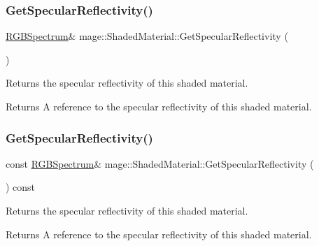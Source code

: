 \subsubsection{\texorpdfstring{Get\+Specular\+Reflectivity()}{GetSpecularReflectivity()}\hspace{0.1cm}{\footnotesize\ttfamily [1/2]}}
{\footnotesize\ttfamily \hyperlink{structmage_1_1_r_g_b_spectrum}{R\+G\+B\+Spectrum}\& mage\+::\+Shaded\+Material\+::\+Get\+Specular\+Reflectivity (\begin{DoxyParamCaption}{ }\end{DoxyParamCaption})\hspace{0.3cm}{\ttfamily [noexcept]}}

Returns the specular reflectivity of this shaded material.

\begin{DoxyReturn}{Returns}
A reference to the specular reflectivity of this shaded material. 
\end{DoxyReturn}
\hypertarget{structmage_1_1_shaded_material_a7655315b6654ee4f6f34ac2489ee6f92}{}\label{structmage_1_1_shaded_material_a7655315b6654ee4f6f34ac2489ee6f92} 
\subsubsection{\texorpdfstring{Get\+Specular\+Reflectivity()}{GetSpecularReflectivity()}\hspace{0.1cm}{\footnotesize\ttfamily [2/2]}}
{\footnotesize\ttfamily const \hyperlink{structmage_1_1_r_g_b_spectrum}{R\+G\+B\+Spectrum}\& mage\+::\+Shaded\+Material\+::\+Get\+Specular\+Reflectivity (\begin{DoxyParamCaption}{ }\end{DoxyParamCaption}) const\hspace{0.3cm}{\ttfamily [noexcept]}}

Returns the specular reflectivity of this shaded material.

\begin{DoxyReturn}{Returns}
A reference to the specular reflectivity of this shaded material. 
\end{DoxyReturn}
\hypertarget{structmage_1_1_shaded_material_a5ea5b4ad3100a2a625b2849ba142cdd6}{}\label{structmage_1_1_shaded_material_a5ea5b4ad3100a2a625b2849ba142cdd6} 
